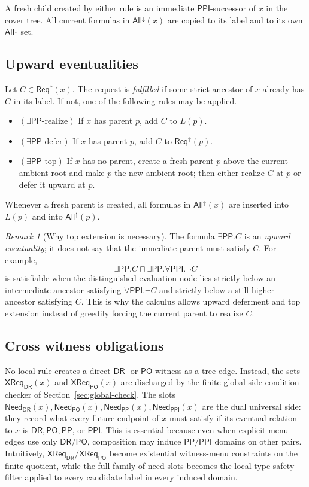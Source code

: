 \documentclass[11pt]{article}
\theoremstyle{remark}
\newtheorem{remark}[definition]{Remark}
\newcommand{\DR}{\mathsf{DR}}
\newcommand{\PO}{\mathsf{PO}}
\newcommand{\PP}{\mathsf{PP}}
\newcommand{\PPI}{\mathsf{PPI}}
\newcommand{\ReqUp}{\mathsf{Req}^{\uparrow}}
\newcommand{\AllUp}{\mathsf{All}^{\uparrow}}
\newcommand{\AllDown}{\mathsf{All}^{\downarrow}}
\newcommand{\CrossDR}{\mathsf{XReq}_{\DR}}
\newcommand{\CrossPO}{\mathsf{XReq}_{\PO}}
\newcommand{\NeedDR}{\mathsf{Need}_{\DR}}
\newcommand{\NeedPO}{\mathsf{Need}_{\PO}}
\newcommand{\NeedPP}{\mathsf{Need}_{\PP}}
\newcommand{\NeedPPI}{\mathsf{Need}_{\PPI}}
\begin{document}
A fresh child created by either rule is an immediate $\PPI$-successor of $x$ in the cover tree. All current formulas in $\AllDown(x)$ are copied to its label and to its own $\AllDown$ set.

\subsection{Upward eventualities}

Let $C\in \ReqUp(x)$. The request is \emph{fulfilled} if some strict ancestor of $x$ already has $C$ in its label. If not, one of the following rules may be applied.

\begin{itemize}
    \item $(\exists\PP\text{-realize})$ If $x$ has parent $p$, add $C$ to $L(p)$.
    \item $(\exists\PP\text{-defer})$ If $x$ has parent $p$, add $C$ to $\ReqUp(p)$.
    \item $(\exists\PP\text{-top})$ If $x$ has no parent, create a fresh parent $p$ above the current ambient root and make $p$ the new ambient root; then either realize $C$ at $p$ or defer it upward at $p$.
\end{itemize}

Whenever a fresh parent is created, all formulas in $\AllUp(x)$ are inserted into $L(p)$ and into $\AllUp(p)$.

\begin{remark}[Why top extension is necessary]
The formula $\exists\PP.C$ is an \emph{upward eventuality}; it does not say that the immediate parent must satisfy $C$. For example,
\[
\exists\PP.C \sqcap \exists\PP.\forall\PPI.\neg C
\]
is satisfiable when the distinguished evaluation node lies strictly below an intermediate ancestor satisfying $\forall\PPI.\neg C$ and strictly below a still higher ancestor satisfying $C$. This is why the calculus allows upward deferment and top extension instead of greedily forcing the current parent to realize $C$.
\end{remark}

\subsection{Cross witness obligations}

No local rule creates a direct $\DR$- or $\PO$-witness as a tree edge. Instead, the sets $\CrossDR(x)$ and $\CrossPO(x)$ are discharged by the finite global side-condition checker of Section~\ref{sec:global-check}. The slots $\NeedDR(x),\NeedPO(x),\NeedPP(x),\NeedPPI(x)$ are the dual universal side: they record what every future endpoint of $x$ must satisfy if its eventual relation to $x$ is $\DR,\PO,\PP$, or $\PPI$. This is essential because even when explicit menu edges use only $\DR/\PO$, composition may induce $\PP/\PPI$ domains on other pairs. Intuitively, $\CrossDR/\CrossPO$ become existential witness-menu constraints on the finite quotient, while the full family of need slots becomes the local type-safety filter applied to every candidate label in every induced domain.
\end{document}
